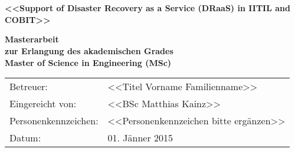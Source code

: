 \begin{titlepage}
	\thispagestyle{scrheadings}
	\ofoot{}
\vspace*{1cm}
\noindent
\vspace*{0.15cm}
\\
\vspace*{0.15cm}
\\
\vspace{3cm}

\begin{center}  %
    \Huge{\textbf{\textsf{
         \textless\textless Support of Disaster Recovery as a Service (DRaaS) in IITIL and COBIT\textgreater\textgreater
    }}}
    \vspace{1cm}

    \Large{\textsf{\textbf{
        Masterarbeit
        \\zur Erlangung des akademischen Grades
        \\Master of Science in Engineering (MSc)
    }}}
\end{center}
\vspace{1cm}

\vfill

\noindent\begin{tabular}{@{}ll}
\textsf{Betreuer:}
&
\textsf{\textless\textless Titel Vorname Familienname\textgreater\textgreater}
\\
\textsf{Eingereicht von:}
&
\textsf{\textless\textless BSc Matthias Kainz\textgreater\textgreater}
\\
\textsf{Personenkennzeichen:}
&
\textsf{\textless\textless Personenkennzeichen bitte ergänzen\textgreater\textgreater}
\\
\textsf{Datum:}
&
\textsf{01. Jänner 2015}
\end{tabular}

\end{titlepage}